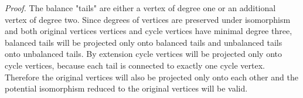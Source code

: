 \textit{Proof.} The balance "tails" are either a vertex of degree one or an additional vertex of degree two. Since degrees of vertices are preserved under isomorphism and both original vertices vertices and cycle vertices have minimal degree three, balanced tails will be projected only onto balanced tails and unbalanced tails onto unbalanced tails. By extension cycle vertices will be projected only onto cycle vertices, because each tail is connected to exactly one cycle vertex. Therefore the original vertices will also be projected only onto each other and the potential isomorphism reduced to the original vertices will be valid.
